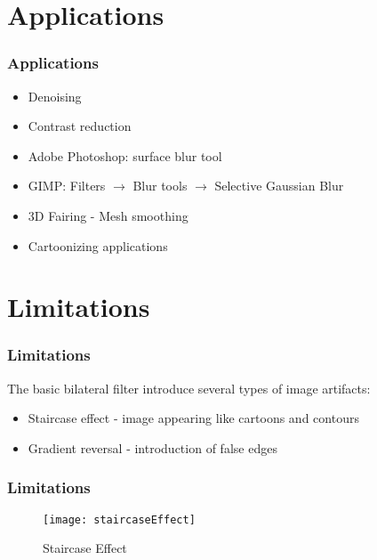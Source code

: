 \documentclass{beamer}
\begin{document}
\section{Applications}

\begin{frame}
\frametitle{Applications}
\begin{itemize}
	\item Denoising
	\pause
	\item Contrast reduction
	\pause
	\item Adobe Photoshop: surface blur tool
	\pause
	\item GIMP: Filters $\rightarrow$ Blur tools $\rightarrow$ Selective Gaussian Blur
	\pause
	\item 3D Fairing - Mesh smoothing
	\pause
	\item Cartoonizing applications
\end{itemize}
\end{frame}

\section{Limitations}
\begin{frame}
\frametitle{Limitations}
The basic bilateral filter introduce several types of image artifacts:
\pause
\begin{itemize}
	\item Staircase effect - image appearing like cartoons and contours
	\item Gradient reversal - introduction of false edges
\end{itemize}
\end{frame}
%

\begin{frame}
\frametitle{Limitations}
\begin{figure}
\texttt{[image: staircaseEffect]}
\caption{Staircase Effect}
\end{figure}
\end{frame}
\end{document}

